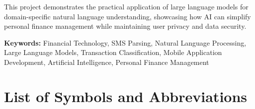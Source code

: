 \documentclass[11pt,a4paper]{report}
\begin{document}
This project demonstrates the practical application of large language models for domain-specific natural language understanding, showcasing how AI can simplify personal finance management while maintaining user privacy and data security.

\textbf{Keywords:} Financial Technology, SMS Parsing, Natural Language Processing, Large Language Models, Transaction Classification, Mobile Application Development, Artificial Intelligence, Personal Finance Management

\newpage

\tableofcontents

\newpage


\newpage


\newpage

\chapter*{List of Symbols and Abbreviations}
\end{document}
